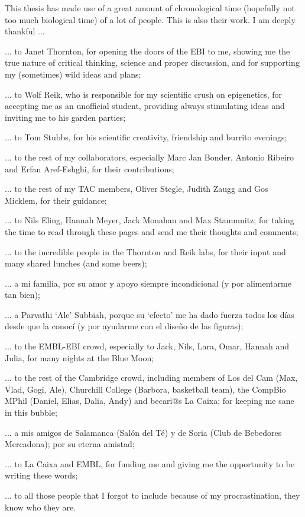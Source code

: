 
\begin{acknowledgements}      

\small
This thesis has made use of a great amount of chronological time (hopefully not too much biological time) of a lot of people. This is also their work. I am deeply thankful ...

\smallskip

... to Janet Thornton, for opening the doors of the EBI to me, showing me the true nature of critical thinking, science and proper discussion, and for supporting my (sometimes) wild ideas and plans;  

... to Wolf Reik, who is responsible for my scientific crush on epigenetics, for accepting me as an unofficial student, providing always stimulating ideas and inviting me to his garden parties;

... to Tom Stubbs, for his scientific creativity, friendship and burrito evenings;

... to the rest of my collaborators, especially Marc Jan Bonder, Antonio Ribeiro and Erfan Aref-Eshghi, for their contributions;

... to the rest of my TAC members, Oliver Stegle, Judith Zaugg and Gos Micklem, for their guidance;

... to Nils Eling, Hannah Meyer, Jack Monahan and Max Stammnitz; for taking the time to read through these pages and send me their thoughts and comments;

... to the incredible people in the Thornton and Reik labs, for their input and many shared lunches (and some beers);

... a mi familia, por su amor y apoyo siempre incondicional (y por alimentarme tan bien);

... a Parvathi `Ale' Subbiah, porque su `efecto' me ha dado fuerza todos los días desde que la conocí (y por ayudarme con el diseño de las figuras);

... to the EMBL-EBI crowd, especially to Jack, Nils, Lara, Omar, Hannah and Julia, for many nights at the Blue Moon;

... to the rest of the Cambridge crowd, including members of Los del Cam (Max, Vlad, Gogi, Ale), Churchill College (Barbora, basketball team), the CompBio MPhil (Daniel, Elias, Dalia, Andy) and becari@s La Caixa; for keeping me sane in this bubble;

... a mis amigos de Salamanca (Salón del Té) y de Soria (Club de Bebedores Mercadona); por su eterna amistad;

... to La Caixa and EMBL, for funding me and giving me the opportunity to be writing these words;

... to all those people that I forgot to include because of my procrastination, they know who they are. 

\normalsize

\end{acknowledgements}
